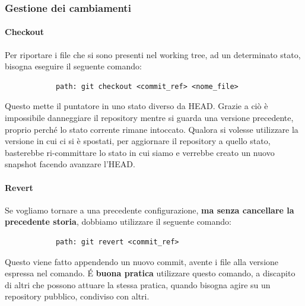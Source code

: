 


		\subsubsection{Gestione dei cambiamenti} %
		\label{ssub:gestione_dei_cambiamenti}
		
			\paragraph{Checkout} %
			\label{par:checkout}
			Per riportare i file che si sono presenti nel working tree, ad un determinato stato, bisogna eseguire il seguente comando:
			\begin{verbatim}
			path: git checkout <commit_ref> <nome_file>
			\end{verbatim}
			Questo mette il puntatore in uno stato diverso da HEAD. Grazie a ciò è impossibile danneggiare il repository mentre si guarda una versione precedente, proprio perché lo stato corrente rimane intoccato. Qualora si volesse utilizzare la versione in cui ci si è spostati, per aggiornare il repository a quello stato, basterebbe ri-committare lo stato in cui siamo e verrebbe creato un nuovo snapshot facendo avanzare l'HEAD.

			\paragraph{Revert} %
			\label{par:revert}
			Se vogliamo tornare a una precedente configurazione, \textbf{ma senza cancellare la precedente storia}, dobbiamo utilizzare il seguente comando:
			\begin{verbatim}
			path: git revert <commit_ref>
			\end{verbatim}
			Questo viene fatto appendendo un nuovo commit, avente i file alla versione espressa nel comando. \newline
			\'E \textbf{buona pratica} utilizzare questo comando, a discapito di altri che possono attuare la stessa pratica, quando bisogna agire su un repository pubblico, condiviso con altri.
		
